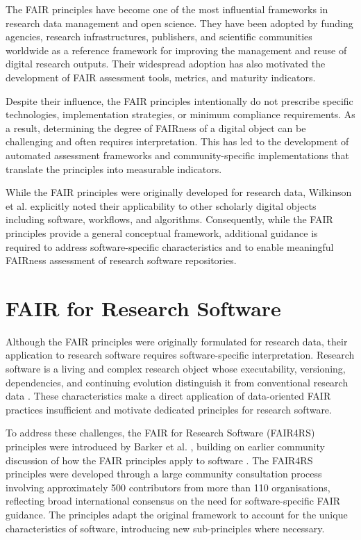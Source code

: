 The FAIR principles have become one of the most influential frameworks 
in research data management and open science. They have been adopted 
by funding agencies, research infrastructures, publishers, and 
scientific communities worldwide as a reference framework for 
improving the management and reuse of digital research outputs. Their 
widespread adoption has also motivated the development of FAIR 
assessment tools, metrics, and maturity indicators.

Despite their influence, the FAIR principles intentionally do not 
prescribe specific technologies, implementation strategies, or minimum 
compliance requirements. As a result, determining the degree of 
FAIRness of a digital object can be challenging and often requires 
interpretation. This has led to the development of automated 
assessment frameworks and community-specific implementations that 
translate the principles into measurable indicators.

While the FAIR principles were originally developed for research data, 
Wilkinson et al. explicitly noted their applicability to other 
scholarly digital objects including software, workflows, and 
algorithms. Consequently, while the FAIR principles provide a general 
conceptual framework, additional guidance is required to address 
software-specific characteristics and to enable meaningful FAIRness 
assessment of research software repositories.

\section{FAIR for Research Software}

Although the FAIR principles were originally formulated for research
data, their application to research software requires software-specific
interpretation. Research software is a living and complex research
object whose executability, versioning, dependencies, and continuing
evolution distinguish it from conventional research data
\cite{katz2021fair}. These characteristics make a direct application
of data-oriented FAIR practices insufficient and motivate dedicated
principles for research software.

To address these challenges, the FAIR for Research Software (FAIR4RS) 
principles were introduced by Barker et al. \cite{barker2022fair4rs}, 
building on earlier community discussion of how the FAIR principles 
apply to software \cite{lamprecht2020fairsoftware}.
The FAIR4RS principles were developed through a large community 
consultation process involving approximately 500 contributors from 
more than 110 organisations, reflecting broad international consensus 
on the need for software-specific FAIR guidance. The principles adapt 
the original framework to account for the unique characteristics of 
software, introducing new sub-principles where necessary.

